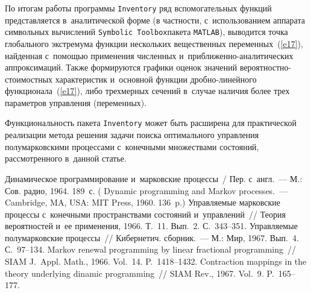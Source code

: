 \begin{multicols}{2}
По итогам работы программы \verb"Inventory" ряд вспомогательных функций 
представляется в~аналитической форме (в частности, с~использованием аппарата 
символьных вычислений  \verb"Symbolic Toolbox"\linebreak пакета \verb"MATLAB"), выводится 
точка глобального экстремума функции нескольких вещественных переменных~(\ref{e17}), 
найденная с~помощью применения численных и~при\-бли\-жен\-но-ана\-ли\-ти\-че\-ских\linebreak 
аппроксимаций. 
Также формируются графики оценок значений ве\-ро\-ят\-ност\-но-сто\-и\-мост\-ных 
характеристик 
и~основной функции дроб\-но-ли\-ней\-но\-го функционала~(\ref{e17}), либо трехмерных 
сечений в~случае наличия более трех параметров управления (переменных).

Функциональность пакета \verb"Inventory" может быть расширена для практической 
реализации метода решения задачи поиска оптимального управ\-ле\-ния полумарковскими 
процессами с~конечными множествами состояний, рассмотренного в~данной статье.


 {\small\frenchspacing
 {%
 \begin{thebibliography}{99}
 Динамическое программирование и~марковские процессы~/ 
Пер. с~англ.~--- М.: Сов. радио, 1964. 189~с.
( Dynamic programming and Markov processes.~--- 
Cambridge, MA, USA: MIT Press, 1960. 136~p.)
 Управляемые марковские процессы с~конечными пространствами 
состояний и~управлений~// Теория вероятностей и~ее применения, 1966. Т.~11. 
Вып.~2. С.~343--351.
 Управляемые полумарковские процессы~// Кибернетич. сборник.~--- 
М.: Мир, 1967. Вып.~4. С.~97--134.
 Markov renewal programming by linear fractional programming~// 
SIAM J.~Appl. Math., 1966. Vol.~14. P.~1418--1432.
 Contraction mappings in the theory underlying dinamic programming~// 
SIAM Rev., 1967. Vol.~9. P.~165--177.


\end{thebibliography}}}
\end{multicols}
